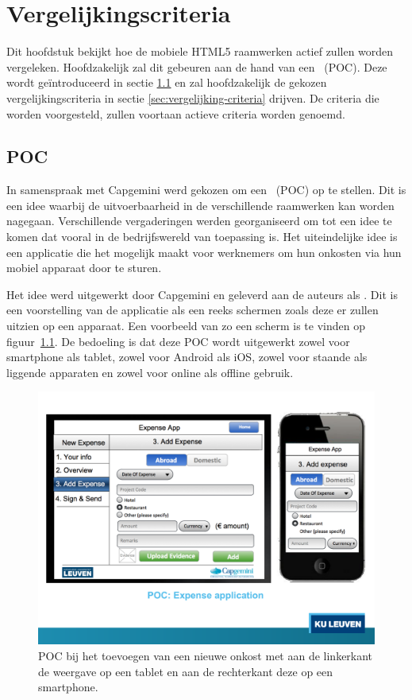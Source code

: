 \chapter{Vergelijkingscriteria}
\label{chap:vergelijkingscriteria}

Dit hoofdstuk bekijkt hoe de mobiele HTML5 raamwerken actief zullen worden vergeleken.
Hoofdzakelijk zal dit gebeuren aan de hand van een ~(POC).
Deze wordt geïntroduceerd in sectie \ref{sec:vergelijking-poc} en zal hoofdzakelijk de gekozen vergelijkingscriteria in sectie \ref{sec:vergelijking-criteria} drijven.
De criteria die worden voorgesteld, zullen voortaan actieve criteria worden genoemd.


\section{POC}
\label{sec:vergelijking-poc}
In samenspraak met Capgemini werd gekozen om een ~(POC) op te stellen.
Dit is een idee waarbij de uitvoerbaarheid in de verschillende raamwerken kan worden nagegaan.
Verschillende vergaderingen werden georganiseerd om tot een idee te komen dat vooral in de bedrijfswereld van toepassing is.
Het uiteindelijke idee is een applicatie die het mogelijk maakt voor werknemers om hun onkosten via hun mobiel apparaat door te sturen.

Het idee werd uitgewerkt door Capgemini en geleverd aan de auteurs als .
Dit is een voorstelling van de applicatie als een reeks schermen zoals deze er zullen uitzien op een apparaat. 
Een voorbeeld van zo een scherm is te vinden op figuur~\ref{fig:poc}. 
De bedoeling is dat deze POC wordt uitgewerkt zowel voor smartphone als tablet, zowel voor Android als iOS, zowel voor staande als liggende apparaten en zowel voor online als offline gebruik.

\begin{figure}
  \centering
  \includegraphics[trim=0cm 4.6cm 0cm 1.55cm,clip=true,width=\textwidth]{figuren/poc.pdf}
  \caption{POC bij het toevoegen van een nieuwe onkost met aan de linkerkant de weergave op een tablet en aan de rechterkant deze op een smartphone.}
  \label{fig:poc}
\end{figure}

